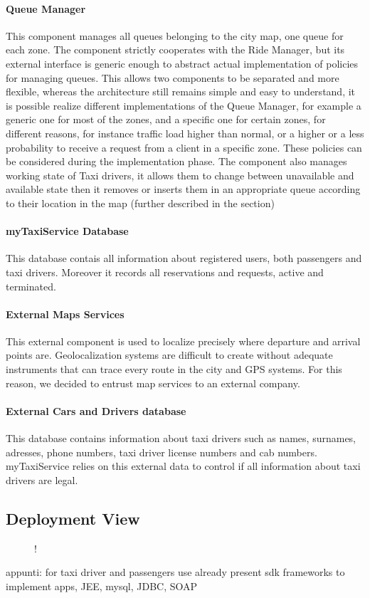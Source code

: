 \paragraph{Queue Manager}
This component manages all queues belonging to the city map, one queue for each zone. The component strictly cooperates with the Ride Manager, but its external interface is generic enough to abstract actual implementation of policies for managing queues. This allows two components to be separated and more flexible, whereas the architecture still remains simple and easy to understand, it is possible realize different implementations of the Queue Manager, for example a generic one for most of the zones, and a specific one for certain zones, for different reasons, for instance traffic load higher than normal, or a higher or a less probability to receive a request from a client in a specific zone. These policies can be considered during the implementation phase. \newline
The component also manages working state of Taxi drivers, it allows them to change between unavailable and available state then it removes or inserts them in an appropriate queue according to their location in the map (further described in the  section)
\paragraph{myTaxiService Database}
This database contais all information about registered users, both passengers and taxi drivers. Moreover it records all reservations and requests, active and terminated.
\paragraph{External Maps Services}
This external component is used to localize precisely where departure and arrival points are. Geolocalization systems are difficult to create without adequate instruments that can trace every route in the city and GPS systems. For this reason, we decided to entrust map services to an external company.
\paragraph{External Cars and Drivers database}
This database contains information about taxi drivers such as names, surnames, adresses, phone numbers, taxi driver license numbers and cab numbers. myTaxiService relies on this external data to control if all information about taxi drivers are legal.
\subsection{Deployment View}
\begin{figure}[H]
	\centering
	\resizebox{6in}
	{!}{}
\end{figure}
appunti: for taxi driver and passengers use already present sdk frameworks to implement apps, JEE, mysql, JDBC, SOAP
